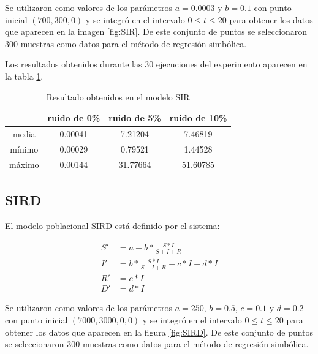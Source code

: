 Se utilizaron como valores de los parámetros $a = 0.0003$ y $b = 0.1$ con punto inicial $(700, 300, 0)$ y se integró en el intervalo $0 \leq t \leq 20$ para obtener los datos que aparecen en la imagen \ref{fig:SIR}. De este conjunto de puntos se seleccionaron 300 muestras como datos para el método de regresión simbólica.

Los resultados obtenidos durante las 30 ejecuciones del experimento aparecen en la tabla \ref{table:experiment_SIR}.

\begin{table}[!h]
    \centering
    \caption{Resultado obtenidos en el modelo SIR}
    \begin{tabular}{|c|c|c|c|}
        \hline
               & \textbf{ruido de 0\%} & \textbf{ruido de 5\%} & \textbf{ruido de 10\%} \\
        \hline
        media  & 0.00041               & 7.21204               & 7.46819                \\
        \hline
        mínimo & 0.00029               & 0.79521               & 1.44528                \\
        \hline
        máximo & 0.00144               & 31.77664              & 51.60785               \\
        \hline
    \end{tabular}
    \label{table:experiment_SIR}
\end{table}



\subsection{SIRD}

El modelo poblacional SIRD está definido por el sistema:

\begin{align*}
    S' & = a - b * \frac{S * I}{S + I + R}             \\
    I' & = b * \frac{S * I}{S + I + R} - c * I - d * I \\
    R' & = c * I                                       \\
    D' & = d * I
\end{align*}

Se utilizaron como valores de los parámetros $a = 250$, $b = 0.5$, $c = 0.1$ y $d = 0.2$ con punto inicial $(7000, 3000, 0, 0)$ y se integró en el intervalo $0 \leq t \leq 20$ para obtener los datos que aparecen en la figura \ref{fig:SIRD}. De este conjunto de puntos se seleccionaron 300 muestras como datos para el método de regresión simbólica.

